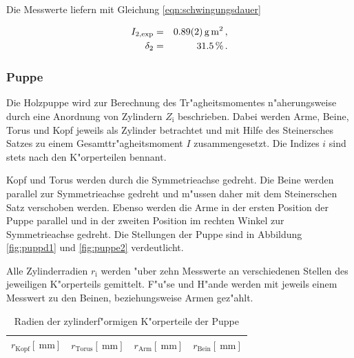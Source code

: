 				Die Messwerte liefern mit Gleichung \eqref{eqn:schwingungsdauer}

				\begin{eqnarray*}
					I_\mathrm{2, exp} & = & \SI{.89 (2)}{\gram \meter \squared} \,, \\
					\delta_2 & = & \SI{31.5}{\percent} \,.
				\end{eqnarray*}

			\clearpage
			\subsubsection{Puppe}
			\label{subsubsec:puppe}
				Die Holzpuppe wird zur Berechnung des Tr"agheitsmomentes n"aherungsweise durch eine Anordnung von Zylindern $Z_\mathrm{i}$ beschrieben.
				Dabei werden Arme, Beine, Torus und Kopf jeweils als Zylinder betrachtet und mit Hilfe des Steinersches Satzes zu einem Gesamttr"agheitsmoment $I$ zusammengesetzt.
				Die Indizes $i$ sind stets nach den K"orperteilen bennant.

				Kopf und Torus werden durch die Symmetrieachse gedreht.
				Die Beine werden parallel zur Symmetrieachse gedreht und m"ussen daher mit dem Steinerschen Satz verschoben werden.
				Ebenso werden die Arme in der ersten Position der Puppe parallel und in der zweiten Position im rechten Winkel zur Symmetrieachse gedreht. Die Stellungen der Puppe sind in Abbildung \ref{fig:puppd1} und \ref{fig:puppe2} verdeutlicht.

				Alle Zylinderradien $r_\mathrm{i}$ werden "uber zehn Messwerte an verschiedenen Stellen des jeweiligen K"orperteils gemittelt.
				F"u"se und H"ande werden mit jeweils einem Messwert zu den Beinen, beziehungsweise Armen gez"ahlt.

				\begin{table}[h!]
					\begin{center}
						\label{tabelle:puppenradien}
						\caption{Radien der zylinderf"ormigen K"orperteile der Puppe}
						\begin{tabular}{|c|c|c|c|}
							\hline
							$r_\mathrm{Kopf} [\SI{}{\milli \meter}]$ & $r_\mathrm{Torus} [\SI{}{\milli \meter}]$ & $r_\mathrm{Arm} [\SI{}{\milli \meter}]$ & $r_\mathrm{Bein} [\SI{}{\milli \meter}]$ \\
							\hline 
							\hline
							
							\hline 
						\end{tabular}
					\end{center}
				\end{table}

